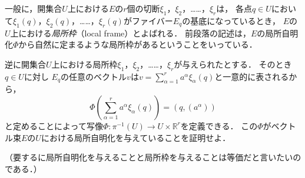 \documentclass[uplatex,dvipdfmx,fontsize=12pt,jafontsize=11pt,line_length=42zw,number_of_lines=36,hanging_punctuation]{jlreq}
\begin{document}
\begin{problems}
		一般に，開集合$U$上における$E$の$r$個の切断$\xi_1$，$\xi_2$，……，$\xi_r$は，
		各点$q\in U$において$\xi_1(q)$，$\xi_2(q)$，……，$\xi_r(q)$がファイバー$E_q$の基底になっているとき，
		$E$の$U$上における\emph{局所枠}（local frame）とよばれる．
		前段落の記述は，$E$の局所自明化$\Phi$から自然に定まるような局所枠があるということをいっている．

		逆に開集合$U$上における局所枠$\xi_1$，$\xi_2$，……，$\xi_r$が与えられたとする．
		そのとき$q\in U$に対し
		$E_q$の任意のベクトル$v$は$v=\sum_{\alpha=1}^ra^\alpha\xi_\alpha(q)$と一意的に表されるから，
		\begin{equation}
			\Phi\left(\sum_{\alpha=1}^ra^\alpha\xi_\alpha(q)\right)=(q,(a^\alpha))
		\end{equation}
		と定めることによって写像$\Phi\colon\pi^{-1}(U)\to U\times\mathbb{R}^r$を定義できる．
		この$\Phi$がベクトル束$E$の$U$における局所自明化を与えていることを証明せよ．

		（要するに局所自明化を与えることと局所枠を与えることは等価だと言いたいのである．）
\end{problems}
\end{document}
